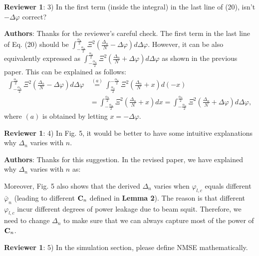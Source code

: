 \documentclass[a4paper,12pt]{article}
\begin{document}
\textbf{Reviewer 1}: 3) In the first term (inside the integral) in the last line of (20), isn't ${- \Delta \varphi}$ correct?


{\color{blue} \textbf{Authors}: Thanks for the reviewer's careful check. The first term in the last line of Eq. (20) should be ${\int_{ - \frac{{{\alpha _n}}}{2}}^{\frac{{{\alpha _n}}}{2}} {{\Xi ^2}\left( {\frac{{{\Delta _n}}}{N} - \Delta \varphi } \right)d\Delta \varphi }}$. However, it can be also equivalently expressed as ${\int_{ - \frac{{{\alpha _n}}}{2}}^{\frac{{{\alpha _n}}}{2}} {{\Xi ^2}\left( {\frac{{{\Delta _n}}}{N} + \Delta \varphi } \right)d\Delta \varphi }}$ as shown in the previous paper. This can be explained as follows:
\begin{align}\label{eq1}
\nonumber \int_{ - \frac{{{\alpha _n}}}{2}}^{\frac{{{\alpha _n}}}{2}} {{\Xi ^2}\left( {\frac{{{\Delta _n}}}{N} - \Delta \varphi } \right)d\Delta \varphi } &\mathop  = \limits^{\left( a \right)} \int_{\frac{{{\alpha _n}}}{2}}^{ - \frac{{{\alpha _n}}}{2}} {{\Xi ^2}\left( {\frac{{{\Delta _n}}}{N} + x} \right)d\left( { - x} \right)} \\ \nonumber
& = \int_{ - \frac{{{\alpha _n}}}{2}}^{\frac{{{\alpha _n}}}{2}} {{\Xi ^2}\left( {\frac{{{\Delta _n}}}{N} + x} \right)dx} = \int_{ - \frac{{{\alpha _n}}}{2}}^{\frac{{{\alpha _n}}}{2}} {{\Xi ^2}\left( {\frac{{{\Delta _n}}}{N} + \Delta \varphi } \right)d\Delta \varphi },
\end{align}
where ${\left( a \right)}$ is obtained by letting ${x =  - \Delta \varphi}$.

}


\textbf{Reviewer 1}: 4) In Fig. 5, it would be better to have some intuitive explanations why ${{\Delta _n}}$ varies with ${n}$.

{\color{blue} \textbf{Authors}: Thanks for this suggestion. In the revised paper, we have explained why ${{\Delta _n}}$ varies with ${n}$ as:
\begin{framed}
{\color{red} Moreover, Fig. 5 also shows that the derived ${{\Delta _n}}$ varies when ${{\varphi _{l,c}}}$ equals different ${{\bar \varphi _n}}$ (leading to different ${{{\bf{C}}_n}}$ defined in \textbf{Lemma 2}). The reason is that different ${{\varphi _{l,c}}}$ incur different degrees of power leakage due to beam squit. Therefore, we need to change ${{\Delta _n}}$ to make sure that we can always capture most of the power of ${{{\bf{C}}_n}}$.}
\end{framed}

}

\textbf{Reviewer 1}: 5) In the simulation section, please define NMSE mathematically.
\end{document}
